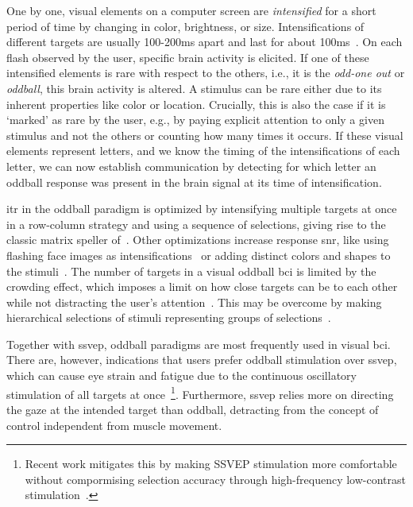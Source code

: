 One by one, visual elements on a computer screen are \emph{intensified} for a short
period of time by changing in color, brightness, or size.
Intensifications of different targets are usually 100-200ms apart and last for about
100ms~\cite{Sellers2006a}.
On each flash observed by the user, specific brain activity is elicited.
If one of these intensified elements is rare with respect to the others, i.e., it is the
\emph{odd-one out} or \emph{oddball}, this brain activity is altered.
A stimulus can be rare either due to its inherent properties like color or location.
Crucially, this is also the case if it is `marked' as rare by the user, e.g., by paying
explicit attention to only a given stimulus and not the others or counting how many
times it occurs.
If these visual elements represent letters, and we know the timing of the
intensifications of each letter, we can now establish communication by detecting for
which letter an oddball response was present in the brain signal at its time of
intensification.

\Ac{itr} in the oddball paradigm is optimized by intensifying multiple targets at once
in a row-column strategy and using a sequence of selections, giving rise to the classic
matrix speller of~\cite{Farwell1988}.
Other optimizations increase response \ac{snr}, like using flashing face images as
intensifications~\cite{Jin2012} or adding distinct colors and shapes to the
stimuli~\cite{Treder2011}.
The number of targets in a visual oddball \ac{bci} is limited by the crowding effect,
which imposes a limit on how close targets can be to each other while not distracting
the user's attention~\cite{Sellers2006a,Li2010}.
This may be overcome by making hierarchical selections of stimuli representing groups
of selections~\cite{Treder2010}.

Together with \ac{ssvep}, oddball paradigms are most frequently used in visual \ac{bci}.
There are, however, indications that users prefer oddball stimulation over \ac{ssvep},
which can cause eye strain and fatigue due to the continuous oscillatory stimulation of
all targets at once~\cite{Xu2021}\footnote{
  Recent work mitigates this by making SSVEP stimulation
  more comfortable without compormising selection accuracy through
  high-frequency low-contrast stimulation~\cite{Ladouce2022}.
}.
Furthermore, \ac{ssvep} relies more on directing the gaze at the intended target than
oddball, detracting from the concept of control independent from muscle movement.

